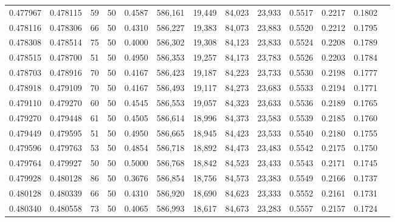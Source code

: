 \begin{tabular}{rrrrrrrrrrrrr}
0.477967 & 0.478115 &    59 &  50 &                                     0.4587 & 586,161 &  19,449 &  84,023 &  23,933 & 0.5517 & 0.2217 & 0.1802 \\
0.478116 & 0.478306 &    66 &  50 &                                     0.4310 & 586,227 &  19,383 &  84,073 &  23,883 & 0.5520 & 0.2212 & 0.1795 \\
0.478308 & 0.478514 &    75 &  50 &                                     0.4000 & 586,302 &  19,308 &  84,123 &  23,833 & 0.5524 & 0.2208 & 0.1789 \\
0.478515 & 0.478700 &    51 &  50 &                                     0.4950 & 586,353 &  19,257 &  84,173 &  23,783 & 0.5526 & 0.2203 & 0.1784 \\
0.478703 & 0.478916 &    70 &  50 &                                     0.4167 & 586,423 &  19,187 &  84,223 &  23,733 & 0.5530 & 0.2198 & 0.1777 \\
0.478918 & 0.479109 &    70 &  50 &                                     0.4167 & 586,493 &  19,117 &  84,273 &  23,683 & 0.5533 & 0.2194 & 0.1771 \\
0.479110 & 0.479270 &    60 &  50 &                                     0.4545 & 586,553 &  19,057 &  84,323 &  23,633 & 0.5536 & 0.2189 & 0.1765 \\
0.479270 & 0.479448 &    61 &  50 &                                     0.4505 & 586,614 &  18,996 &  84,373 &  23,583 & 0.5539 & 0.2185 & 0.1760 \\
0.479449 & 0.479595 &    51 &  50 &                                     0.4950 & 586,665 &  18,945 &  84,423 &  23,533 & 0.5540 & 0.2180 & 0.1755 \\
0.479596 & 0.479763 &    53 &  50 &                                     0.4854 & 586,718 &  18,892 &  84,473 &  23,483 & 0.5542 & 0.2175 & 0.1750 \\
0.479764 & 0.479927 &    50 &  50 &                                     0.5000 & 586,768 &  18,842 &  84,523 &  23,433 & 0.5543 & 0.2171 & 0.1745 \\
0.479928 & 0.480128 &    86 &  50 &                                     0.3676 & 586,854 &  18,756 &  84,573 &  23,383 & 0.5549 & 0.2166 & 0.1737 \\
0.480128 & 0.480339 &    66 &  50 &                                     0.4310 & 586,920 &  18,690 &  84,623 &  23,333 & 0.5552 & 0.2161 & 0.1731 \\
0.480340 & 0.480558 &    73 &  50 &                                     0.4065 & 586,993 &  18,617 &  84,673 &  23,283 & 0.5557 & 0.2157 & 0.1724 \\

\end{tabular}
